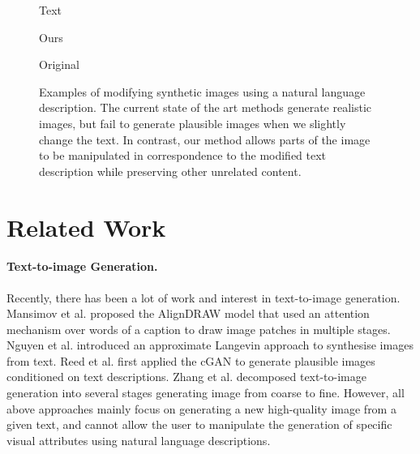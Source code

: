 \documentclass{article}
\begin{document}
\begin{figure}[t]
\begin{minipage}{\textwidth}
\quad\begin{minipage}{0.4\textwidth}\centering
\small{Text}
\end{minipage}
\quad\begin{minipage}{0.12\textwidth}
\centering
\small{\cite{zhang2017stackgan}}
\end{minipage}
\begin{minipage}{0.12\textwidth}
\centering
\small{\cite{xu2018attngan}}
\end{minipage}
\begin{minipage}{0.12\textwidth}
\centering
\small{Ours}
\end{minipage}
\begin{minipage}{0.12\textwidth}
\centering
\small{Original}
\end{minipage}
\end{minipage}

\centering
\caption{Examples of modifying synthetic images using a natural language description. The current state of the art methods generate realistic images, but fail to generate plausible images when we slightly change the text. In contrast, our method allows parts of the image to be manipulated in correspondence to the modified text description while preserving other unrelated content.}
\label{fig:issue}
\end{figure}

\section{Related Work}
\label{rel_work}
\paragraph{Text-to-image Generation.} Recently, there has been a lot of work and interest in text-to-image generation. Mansimov et al. \cite{mansimov2015generating} proposed the AlignDRAW model that used an attention mechanism over words of a caption to draw image patches in multiple stages. Nguyen et al. \cite{nguyen2017plug} introduced an approximate Langevin approach to synthesise images from text. Reed et al. \cite{reed2016generative} first applied the cGAN to generate plausible images conditioned on text descriptions. Zhang et al. \cite{zhang2017stackgan} decomposed text-to-image generation into several stages generating image from coarse to fine.
However, all above approaches mainly focus on generating a new high-quality image from a given text, and cannot allow the user to manipulate the generation of specific visual attributes using natural language descriptions.
\end{document}
